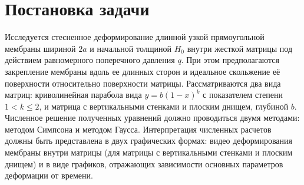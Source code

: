 \section{Постановка задачи}
Исследуется стесненное деформирование длинной узкой прямоугольной мембраны шириной $2a$ и начальной толщиной $H_0$ внутри жесткой матрицы под 
действием равномерного поперечного давления $q$. При этом предполагаются закрепление мембраны вдоль ее длинных сторон и идеальное скольжение 
её поверхности относительно поверхности матрицы.
Рассматриваются два вида матриц: криволинейная парабола вида $y = b(1-x)^k$ с показателем степени $1<k \leqslant 2$, и матрица с вертикальными 
стенками и плоским днищем, глубиной $b$.
\medskip
Численное решение полученных уравнений должно проводиться двумя методами: методом Симпсона и методом Гаусса. Интерпретация численных расчетов должны быть представлена в двух графических формах: видео деформирования мембраны внутри матрицы (для матрицы с вертикальными стенками и плоским днищем) и в виде графиков, отражающих зависимости основных параметров деформации от времени.